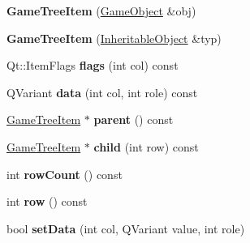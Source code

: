 \begin{DoxyCompactItemize}
\item 
\hypertarget{class_game_tree_item_ae7b1b4ef2b52d744bf291d93a836f426}{{\bfseries \-Game\-Tree\-Item} (\hyperlink{class_game_object}{\-Game\-Object} \&obj)}\label{class_game_tree_item_ae7b1b4ef2b52d744bf291d93a836f426}

\item 
\hypertarget{class_game_tree_item_ac5b9c6cdd781269439d9a1855a7e6fe5}{{\bfseries \-Game\-Tree\-Item} (\hyperlink{class_inheritable_object}{\-Inheritable\-Object} \&typ)}\label{class_game_tree_item_ac5b9c6cdd781269439d9a1855a7e6fe5}

\item 
\hypertarget{class_game_tree_item_a036054413680c7849828bda7c5ab797e}{\-Qt\-::\-Item\-Flags {\bfseries flags} (int col) const }\label{class_game_tree_item_a036054413680c7849828bda7c5ab797e}

\item 
\hypertarget{class_game_tree_item_affd0244eba999981e24cca1b078f2a57}{\-Q\-Variant {\bfseries data} (int col, int role) const }\label{class_game_tree_item_affd0244eba999981e24cca1b078f2a57}

\item 
\hypertarget{class_game_tree_item_a37646b54531bf9139a21e2b2b0e6b9d3}{\hyperlink{class_game_tree_item}{\-Game\-Tree\-Item} $\ast$ {\bfseries parent} () const }\label{class_game_tree_item_a37646b54531bf9139a21e2b2b0e6b9d3}

\item 
\hypertarget{class_game_tree_item_a8ee174720560a36f00e134af7a97cf65}{\hyperlink{class_game_tree_item}{\-Game\-Tree\-Item} $\ast$ {\bfseries child} (int row) const }\label{class_game_tree_item_a8ee174720560a36f00e134af7a97cf65}

\item 
\hypertarget{class_game_tree_item_a99f37119fb7c03cccd48919196ae6ef2}{int {\bfseries row\-Count} () const }\label{class_game_tree_item_a99f37119fb7c03cccd48919196ae6ef2}

\item 
\hypertarget{class_game_tree_item_a165fab8ad302d5a08032433c53612014}{int {\bfseries row} () const }\label{class_game_tree_item_a165fab8ad302d5a08032433c53612014}

\item 
\hypertarget{class_game_tree_item_ae0fbc6d3f64882f8593bcfb8e611912b}{bool {\bfseries set\-Data} (int col, \-Q\-Variant value, int role)}\label{class_game_tree_item_ae0fbc6d3f64882f8593bcfb8e611912b}


\end{DoxyCompactItemize}
